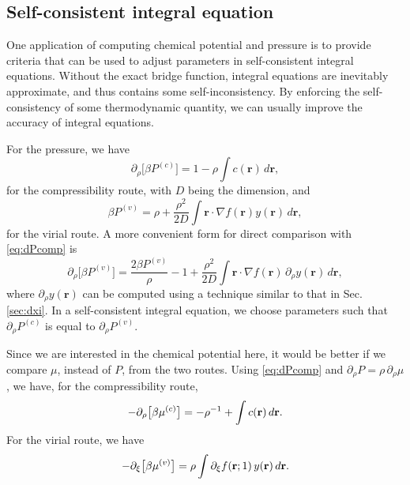 \documentclass[aip,jcp,reprint,superscriptaddress]{revtex4-1}
\newcommand{\vct}[1]{\mathbf{#1}}
\providecommand{\vr}{} %
\renewcommand{\vr}{\vct{r}}
\begin{document}
\subsection{\label{sec:sc} Self-consistent integral equation}



One application of computing chemical potential and pressure
is to provide criteria that can be used
to adjust parameters in self-consistent integral equations.
%
Without the exact bridge function, integral equations
are inevitably approximate, and thus contains some self-inconsistency.
%
By enforcing the self-consistency
of some thermodynamic quantity,
we can usually improve the accuracy of integral equations.

For the pressure, we have
\begin{equation}
  \partial_\rho \big[ \beta P^{(c)} \big] = 1 - \rho \int c(\vr) \, d\vr,
  \label{eq:dPcomp}
\end{equation}
for the compressibility route, with $D$ being the dimension, and
%
\begin{equation}
  \beta P^{(v)} = \rho + \frac{\rho^2}{2D} \int \vr \cdot \nabla f(\vr) y(\vr) \, d\vr,
  \label{eq:Pvirial}
\end{equation}
for the virial route.
%
A more convenient form for direct comparison with \eqref{eq:dPcomp} is
\begin{equation}
  \partial_\rho \big[ \beta P^{(v)} \big] =
    \frac{ 2\beta P^{(v)} }{ \rho } - 1
    + \frac{\rho^2}{2D} \int \vr \cdot \nabla f(\vr) \, \partial_\rho y(\vr) \, d\vr,
  \label{eq:dPvirial}
\end{equation}
where $\partial_\rho y(\vr)$ can be computed using a technique similar to that in Sec. \ref{sec:dxi}.
%
In a self-consistent integral equation,
we choose parameters such that
$\partial_\rho P^{(c)}$
is equal to
$\partial_\rho P^{(v)}$.


Since we are interested in the chemical potential here,
it would be better if we compare $\mu$, instead of $P$, from the two routes.
%
Using \eqref{eq:dPcomp} and $\partial_\rho P = \rho \, \partial_\rho \mu$,
we have, for the compressibility route,
\begin{equation}
  -\partial_\rho \big[ \beta \mu^{(c)} \big]
  =  -\rho^{-1} + \int c(\vr) \, d\vr.
  \notag
\end{equation}
For the virial route, we have
\begin{equation}
  -\partial_\xi \big[ \beta \mu^{(v)} \big]
  =  \rho \int \partial_\xi f(\vr; 1) \, y(\vr) \, d\vr.
  \notag
  \label{eq:dmudxi}
\end{equation}
\end{document}
